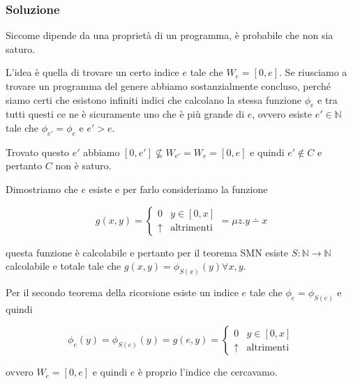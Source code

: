 \subsubsection{Soluzione}

Siccome dipende da una proprietà di un programma, è probabile che non sia saturo.

L'idea è quella di trovare un certo indice $e$ tale che $W_e = [0,e]$. Se riusciamo a trovare un programma del genere abbiamo sostanzialmente concluso, perché siamo certi che esistono infiniti indici che calcolano la stessa funzione $\phi_e$ e tra tutti questi ce ne è sicuramente uno che è più grande di $e$, ovvero esiste $e' \in \mathbb{N}$ tale che $\phi_{e'} = \phi_e$ e $e' > e$.

Trovato questo $e'$ abbiamo $[0, e'] \nsubseteq W_{e'} = W_e = [0,e]$ e quindi $e' \notin C$ e pertanto $C$ non è saturo.

Dimostriamo che $e$ esiste e per farlo consideriamo la funzione

$$
g(x,y) = \begin{cases}
0 & y \in [0,x] \\
\uparrow &\text{altrimenti}
\end{cases} = \mu z . y \dotminus x
$$

questa funzione è calcolabile e pertanto per il teorema SMN esiste $S : \mathbb{N} \rightarrow \mathbb{N}$ calcolabile e totale tale che $g(x,y) = \phi_{S(x)}(y) \forall x,y$.

Per il secondo teorema della ricorsione esiste un indice $e$ tale che $\phi_e = \phi_{S(e)}$ e quindi

$$
\phi_e(y) = \phi_{S(e)}(y) = g(e,y) = \begin{cases}
0 & y \in [0,x] \\
\uparrow &\text{altrimenti}
\end{cases}
$$

ovvero $W_e = [0,e]$ e quindi $e$ è proprio l'indice che cercavamo.
